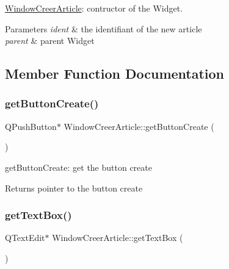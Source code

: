 \hyperlink{class_window_creer_article}{Window\+Creer\+Article}\+: contructor of the Widget. 


\begin{DoxyParams}{Parameters}
{\em ident} & the identifiant of the new article \\
\hline
{\em parent} & parent Widget \\
\hline
\end{DoxyParams}


\subsection{Member Function Documentation}
\mbox{\label{class_window_creer_article_a9ad8fafa868025bf32085515d5c32f10}} 
\subsubsection{\texorpdfstring{get\+Button\+Create()}{getButtonCreate()}}
{\footnotesize\ttfamily Q\+Push\+Button$\ast$ Window\+Creer\+Article\+::get\+Button\+Create (\begin{DoxyParamCaption}{ }\end{DoxyParamCaption})\hspace{0.3cm}{\ttfamily [inline]}}



get\+Button\+Create\+: get the button create 

\begin{DoxyReturn}{Returns}
pointer to the button create 
\end{DoxyReturn}
\mbox{\label{class_window_creer_article_a3360676f4cc24185a3af311353c3c356}} 
\subsubsection{\texorpdfstring{get\+Text\+Box()}{getTextBox()}}
{\footnotesize\ttfamily Q\+Text\+Edit$\ast$ Window\+Creer\+Article\+::get\+Text\+Box (\begin{DoxyParamCaption}{ }\end{DoxyParamCaption})\hspace{0.3cm}{\ttfamily [inline]}}



